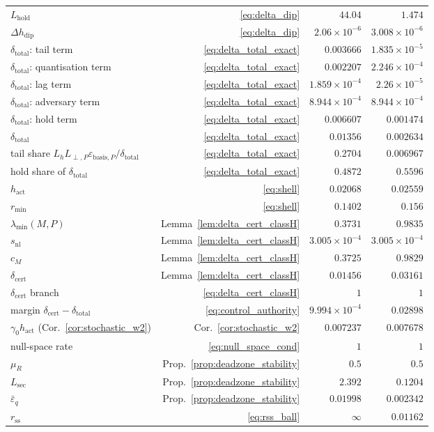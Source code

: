 \begin{table}[t]
\begin{tabular}{lrrr}
$L_{\mathrm{hold}}$ & \eqref{eq:delta_dip} & $44.04$ & $1.474$ \\
$\Delta h_{\mathrm{dip}}$ & \eqref{eq:delta_dip} & $2.06\times10^{-6}$ & $3.008\times10^{-6}$ \\
$\delta_{\mathrm{total}}$: tail term & \eqref{eq:delta_total_exact} & $0.003666$ & $1.835\times10^{-5}$ \\
$\delta_{\mathrm{total}}$: quantisation term & \eqref{eq:delta_total_exact} & $0.002207$ & $2.246\times10^{-4}$ \\
$\delta_{\mathrm{total}}$: lag term & \eqref{eq:delta_total_exact} & $1.859\times10^{-4}$ & $2.26\times10^{-5}$ \\
$\delta_{\mathrm{total}}$: adversary term & \eqref{eq:delta_total_exact} & $8.944\times10^{-4}$ & $8.944\times10^{-4}$ \\
$\delta_{\mathrm{total}}$: hold term & \eqref{eq:delta_total_exact} & $0.006607$ & $0.001474$ \\
$\delta_{\mathrm{total}}$ & \eqref{eq:delta_total_exact} & $0.01356$ & $0.002634$ \\
tail share $L_hL_{\perp,P}\varepsilon_{\mathrm{basis},P}/\delta_{\mathrm{total}}$ & \eqref{eq:delta_total_exact} & $0.2704$ & $0.006967$ \\
hold share of $\delta_{\mathrm{total}}$ & \eqref{eq:delta_total_exact} & $0.4872$ & $0.5596$ \\
$h_{\mathrm{act}}$ & \eqref{eq:shell} & $0.02068$ & $0.02559$ \\
$r_{\min}$ & \eqref{eq:shell} & $0.1402$ & $0.156$ \\
$\lambda_{\min}(M,P)$ & Lemma~\ref{lem:delta_cert_classH} & $0.3731$ & $0.9835$ \\
$s_{\mathrm{nl}}$ & Lemma~\ref{lem:delta_cert_classH} & $3.005\times10^{-4}$ & $3.005\times10^{-4}$ \\
$c_M$ & Lemma~\ref{lem:delta_cert_classH} & $0.3725$ & $0.9829$ \\
$\delta_{\mathrm{cert}}$ & Lemma~\ref{lem:delta_cert_classH} & $0.01456$ & $0.03161$ \\
$\delta_{\mathrm{cert}}$ branch & \eqref{eq:delta_cert_classH} & $1$ & $1$ \\
margin $\delta_{\mathrm{cert}}-\delta_{\mathrm{total}}$ & \eqref{eq:control_authority} & $9.994\times10^{-4}$ & $0.02898$ \\
$\gamma_0h_{\mathrm{act}}$ (Cor.~\ref{cor:stochastic_w2}) & Cor.~\ref{cor:stochastic_w2} & $0.007237$ & $0.007678$ \\
null-space rate & \eqref{eq:null_space_cond} & $1$ & $1$ \\
$\mu_R$ & Prop.~\ref{prop:deadzone_stability} & $0.5$ & $0.5$ \\
$L_{\mathrm{sec}}$ & Prop.~\ref{prop:deadzone_stability} & $2.392$ & $0.1204$ \\
$\bar\varepsilon_q$ & Prop.~\ref{prop:deadzone_stability} & $0.01998$ & $0.002342$ \\
$r_{\mathrm{ss}}$ & \eqref{eq:rss_ball} & $\infty$ & $0.01162$ \\
\bottomrule
\end{tabular}
\end{table}
